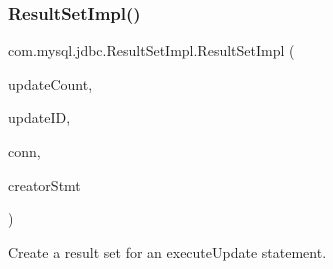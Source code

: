 \subsubsection{\texorpdfstring{Result\+Set\+Impl()}{ResultSetImpl()}\hspace{0.1cm}{\footnotesize\ttfamily [1/2]}}
{\footnotesize\ttfamily com.\+mysql.\+jdbc.\+Result\+Set\+Impl.\+Result\+Set\+Impl (\begin{DoxyParamCaption}\item[{long}]{update\+Count,  }\item[{long}]{update\+ID,  }\item[{\mbox{\hyperlink{interfacecom_1_1mysql_1_1jdbc_1_1_my_s_q_l_connection}{My\+S\+Q\+L\+Connection}}}]{conn,  }\item[{\mbox{\hyperlink{classcom_1_1mysql_1_1jdbc_1_1_statement_impl}{Statement\+Impl}}}]{creator\+Stmt }\end{DoxyParamCaption})}

Create a result set for an execute\+Update statement.


